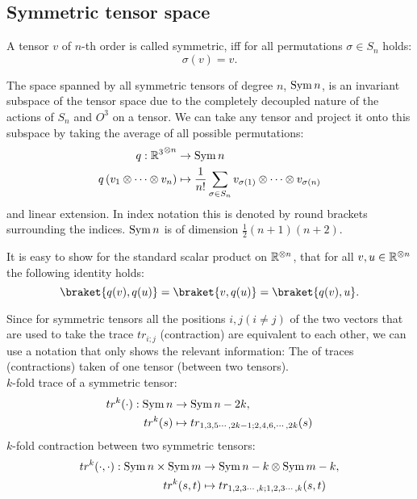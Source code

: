 \subsection{Symmetric tensor space}
\begin{definition}
	A tensor $v$ of $n$-th order is called symmetric, iff for all permutations $\sigma \in S_n$ holds:
	\[\sigma(v) = v.\]
\end{definition}
The space spanned by all symmetric tensors of degree $n$, $\operatorname{Sym}{n}$, is an invariant subspace of the tensor space due to the completely decoupled nature of the actions of $S_n$ and $O^3$ on a tensor. We can take any tensor and project it onto this subspace by taking the average of all possible permutations:
\begin{align*}
	q: {\mathbb{R}^3}^{\otimes n} &\to \operatorname{Sym}{n}\\
	q\left(v_1 \otimes \cdots  \otimes v_n\right) &\mapsto \frac{1}{n!} \sum_{\sigma \in S_n} v_{\sigma(1)} \otimes \cdots \otimes v_{\sigma(n)}
\end{align*}
and linear extension. In index notation this is denoted by round brackets surrounding the indices. $\operatorname{Sym}{n}$ is of dimension $\frac{1}{2}(n+1)(n+2)$.

\begin{note}[]
	It is easy to show for the standard scalar product on $\mathbb{R}^{\otimes n}$, that for all $v,u \in \mathbb{R}^{\otimes n}$ the following identity holds:
	\begin{equation}
		\braket{q(v),q(u)} = \braket{v,q(u)} = \braket{q(v),u}.
		\label{eq:scalarqprod}
	\end{equation}
\end{note}
\begin{definition}
	Since for symmetric tensors all the positions $i,j (i\neq j)$ of the two vectors that are used to take the trace $tr_{i;j}$ (contraction) are equivalent to each other, we can use a notation that only shows the relevant information: The  of traces (contractions) taken of one tensor (between two tensors). \\
	$k$-fold trace of a symmetric tensor:
	\begin{align*}
		tr^{k} (\cdot): \operatorname{Sym}{n} &\to \operatorname{Sym}{n-2k},\\
		tr^{k} (s) & \mapsto tr_{1,3,5\cdots, 2k-1;2,4,6,\cdots,2k} (s)
	\end{align*}
	$k$-fold contraction between two symmetric tensors:
	\begin{align*}
		tr^{k} (\cdot,\cdot): \operatorname{Sym}{n}\times\operatorname{Sym}{m} &\to \operatorname{Sym}{n-k}\otimes\operatorname{Sym}{m-k},\\
		tr^{k} (s,t) & \mapsto tr_{1,2,3\cdots, k;1,2,3\cdots,k} (s,t)
	\end{align*}		
\end{definition}

